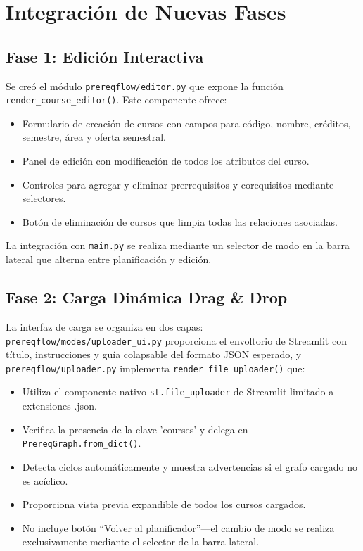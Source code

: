 \documentclass[12pt]{report}
\begin{document}
\section{Integración de Nuevas Fases}

\subsection{Fase 1: Edición Interactiva}
Se creó el módulo \texttt{prereqflow/editor.py} que expone la función \texttt{render\_course\_editor()}. Este componente ofrece:
\begin{itemize}
    \item Formulario de creación de cursos con campos para código, nombre, créditos, semestre, área y oferta semestral.
    \item Panel de edición con modificación de todos los atributos del curso.
    \item Controles para agregar y eliminar prerrequisitos y corequisitos mediante selectores.
    \item Botón de eliminación de cursos que limpia todas las relaciones asociadas.
\end{itemize}
La integración con \texttt{main.py} se realiza mediante un selector de modo en la barra lateral que alterna entre planificación y edición.

\subsection{Fase 2: Carga Dinámica Drag \& Drop}
La interfaz de carga se organiza en dos capas: \texttt{prereqflow/modes/uploader\_ui.py} proporciona el envoltorio de Streamlit con título, instrucciones y guía colapsable del formato JSON esperado, y \texttt{prereqflow/uploader.py} implementa \texttt{render\_file\_uploader()} que:
\begin{itemize}
    \item Utiliza el componente nativo \texttt{st.file\_uploader} de Streamlit limitado a extensiones .json.
    \item Verifica la presencia de la clave 'courses' y delega en \texttt{PrereqGraph.from\_dict()}.
    \item Detecta ciclos automáticamente y muestra advertencias si el grafo cargado no es acíclico.
    \item Proporciona vista previa expandible de todos los cursos cargados.
    \item No incluye botón \enquote{Volver al planificador}---el cambio de modo se realiza exclusivamente mediante el selector de la barra lateral.
\end{itemize}
\end{document}
